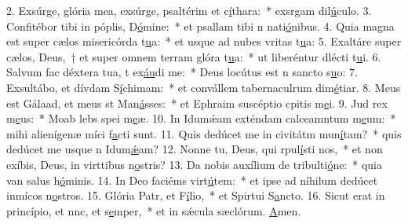 2. Exsúrge, glória mea, exsúrge, psaltérim et c\uline{í}thara:~* exsrgam dil\uline{ú}culo.
3. Confitébor tibi in póplis, D\uline{ó}mine:~* et psallam tibi n nati\uline{ó}nibus.
4. Quia magna est super cælos misericórda t\uline{u}a:~* et usque ad nubes vritas t\uline{u}a:
5. Exaltáre super cælos, Deus,~† et super omnem terram glóra t\uline{u}a:~* ut liberéntur dlécti t\uline{u}i.
6. Salvum fac déxtera tua, t ex\uline{áu}di me:~* Deus locútus est n sancto s\uline{u}o:
7. Exsultábo, et dívdam S\uline{í}chimam:~* et convállem tabernaculrum dim\uline{é}tiar.
8. Meus est Gálaad, et meus st Man\uline{á}sses:~* et Ephraim suscéptio cpitis m\uline{e}i.
9. Jud rex m\uline{e}us:~* Moab lebs spei m\uline{e}æ.
10. In Idumǽam exténdam calceamntum m\uline{e}um:~* mihi alienígenæ míci f\uline{a}cti sunt.
11. Quis dedúcet me in civitátm mun\uline{í}tam?~* quis dedúcet me usque n Idum\uline{ǽ}am?
12. Nonne tu, Deus, qui rpul\uline{í}sti nos,~* et non exíbis, Deus, in virttibus n\uline{o}stris?
13. Da nobis auxílium de tribulti\uline{ó}ne:~* quia van salus h\uline{ó}minis.
14. In Deo faciéms virt\uline{ú}tem:~* et ipse ad níhilum dedúcet inmícos n\uline{o}stros.
15. Glória Patr, et F\uline{í}lio,~* et Spirtui S\uline{a}ncto.
16. Sicut erat in princípio, et nnc, et s\uline{e}mper,~* et in sǽcula sæclórum. \uline{A}men.
